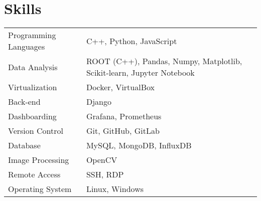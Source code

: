 \documentclass[a4paper,12pt]{article}
\begin{document}

\section{Skills}
\begin{tabularx}{\linewidth}{@{}l X@{}}
Programming Languages &  \normalsize{C++, Python, JavaScript}\\
Data Analysis & \normalsize{ROOT (C++), Pandas, Numpy, Matplotlib, Scikit-learn, Jupyter Notebook}\\
Virtualization & \normalsize{Docker, VirtualBox}\\
Back-end & \normalsize{Django}\\
Dashboarding & \normalsize{Grafana, Prometheus}\\
Version Control & \normalsize{Git, GitHub, GitLab}\\
Database & \normalsize{MySQL, MongoDB, InfluxDB}\\
Image Processing & \normalsize{OpenCV}\\
Remote Access & \normalsize{SSH, RDP}\\
Operating System & \normalsize{Linux, Windows}\\
\end{tabularx}

\end{document}
